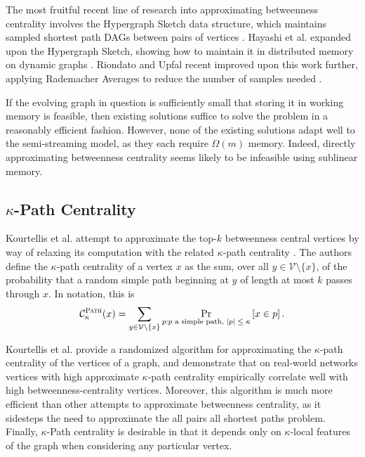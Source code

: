 \documentclass{report}
\newcommand{\algoname}[1]{\textnormal{\textsc{#1}}}
\begin{document}
The most fruitful recent line of research into approximating betweenness centrality involves the Hypergraph Sketch data structure,  which maintains sampled shortest path DAGs between pairs of vertices \cite{yoshida2014almost}. 
Hayashi et al. expanded upon the Hypergraph Sketch, showing how to maintain it in distributed memory on dynamic graphs \cite{hayashi2015fully}. 
Riondato and Upfal recent improved upon this work further, applying Rademacher Averages to reduce the number of samples needed \cite{riondato2018abra}.

If the evolving graph in question is sufficiently small that storing it in working memory is feasible, then existing solutions suffice to solve the problem in a reasonably efficient fashion. 
However, none of the existing solutions adapt well to the semi-streaming model, as they each require $\Omega(m)$ memory. 
Indeed, directly approximating betweenness centrality seems likely to be infeasible using sublinear memory.


\subsection{$\kappa$-Path Centrality} \label{sec:kpc}

Kourtellis et al. attempt to approximate the top-$k$ betweenness central vertices by way of relaxing its computation with the related $\kappa$-path centrality \cite{alahakoon2011k, kourtellis2013identifying}.
The authors define the $\kappa$-path centrality of a vertex $x$ as the sum, over all $y \in \mathcal{V} \setminus \{x\}$, of the probability that a random simple path beginning at $y$ of length at most $k$ passes through $x$. 
In notation, this is 
%
\begin{equation} \label{eq:kpath}
	\mathcal{C}^{\algoname{Path}}_\kappa(x) = \sum\limits_{y \in \mathcal{V} \setminus \{x\}} 
		\Pr_{p: \textnormal{$p$ a simple path, $|p| \leq \kappa$}}
 		\left [ x \in p \right ].
\end{equation}
%


Kourtellis et al. provide a randomized algorithm for approximating the $\kappa$-path centrality of the vertices of a graph, and demonstrate that on real-world networks vertices with high approximate $\kappa$-path centrality empirically correlate well with high betweenness-centrality vertices. 
Moreover, this algorithm is much more efficient than other attempts to approximate betweenness centrality, as it sidesteps the need to approximate the all pairs all shortest paths problem.
Finally, $\kappa$-Path centrality is desirable in that it depends only on $\kappa$-local features of the graph when considering any particular vertex.
\end{document}
